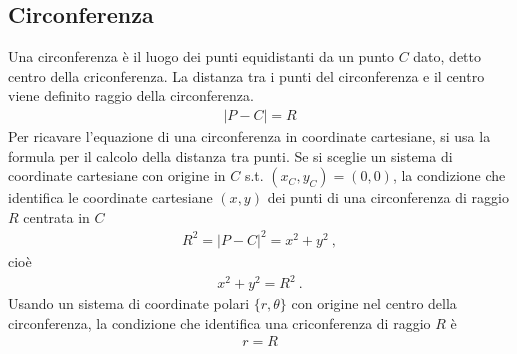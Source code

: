 \documentclass[letterpaper,10pt,english]{jupyterBook}
\begin{document}
\subsection{Circonferenza}
\label{\detokenize{ch/analytic_geometry/analytic_geometry_2d/conics-cartesian:circonferenza}}
\sphinxAtStartPar
{} Una circonferenza è il luogo dei punti equidistanti da un punto \(C\) dato, detto centro della criconferenza. La distanza tra i punti del circonferenza e il centro viene definito raggio della circonferenza.
\begin{equation*}
\begin{split}|P - C| = R\end{split}
\end{equation*}
\sphinxAtStartPar
{} Per ricavare l’equazione di una circonferenza in coordinate cartesiane, si usa la formula per il calcolo della distanza tra punti. Se si sceglie un sistema di coordinate cartesiane con origine in \(C\) s.t. \((x_C, y_C) = (0,0)\), la condizione che identifica le coordinate cartesiane \((x,y)\) dei punti di una circonferenza di raggio \(R\) centrata in \(C\)
\begin{equation*}
\begin{split}R^2 = |P-C|^2 = x^2 + y^2 \ ,\end{split}
\end{equation*}
\sphinxAtStartPar
cioè
\begin{equation*}
\begin{split}x^2 + y^2 = R^2 \ .\end{split}
\end{equation*}
\sphinxAtStartPar
{} Usando un sistema di coordinate polari \(\{r, \theta\}\) con origine nel centro della circonferenza, la condizione che identifica una criconferenza di raggio \(R\) è
\begin{equation*}
\begin{split}r = R\end{split}
\end{equation*}
\end{document}
